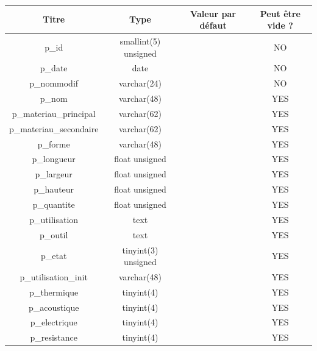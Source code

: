 \documentclass[12pt,a4paper]{article}
\begin{document}
    \begin{table}
        \begin{center}
            \footnotesize
            \begin{tabular}{|c|c|c|c|}
                \hline
                Titre & Type & Valeur par défaut & Peut être vide ? \\
                \hline
                p\_id & smallint(5) unsigned &  & NO \\
                \hline
                p\_date & date &  & NO \\
                \hline
                p\_nommodif & varchar(24) &  & NO \\
                \hline
                p\_nom & varchar(48) &  & YES \\
                \hline
                p\_materiau\_principal & varchar(62) &  & YES \\
                \hline
                p\_materiau\_secondaire & varchar(62) &  & YES \\
                \hline
                p\_forme & varchar(48) &  & YES \\
                \hline
                p\_longueur & float unsigned &  & YES \\
                \hline
                p\_largeur & float unsigned &  & YES \\
                \hline
                p\_hauteur & float unsigned &  & YES \\
                \hline
                p\_quantite & float unsigned &  & YES \\
                \hline
                p\_utilisation & text &  & YES \\
                \hline
                p\_outil & text &  & YES \\
                \hline
                p\_etat & tinyint(3) unsigned &  & YES \\
                \hline
                p\_utilisation\_init & varchar(48) &  & YES \\
                \hline
                p\_thermique & tinyint(4) &  & YES \\
                \hline
                p\_acoustique & tinyint(4) &  & YES \\
                \hline
                p\_electrique & tinyint(4) &  & YES \\
                \hline
                p\_resistance & tinyint(4) &  & YES \\
                \hline

\end{tabular}
\end{center}
\end{table}
\end{document}
